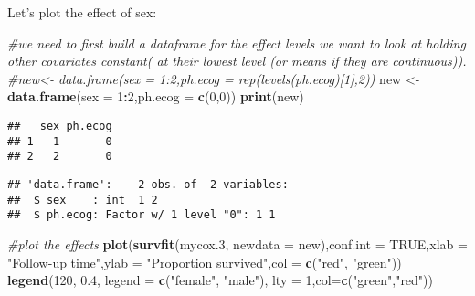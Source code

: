 \documentclass[]{book}
\newenvironment{Shaded}{\begin{snugshade}}{\end{snugshade}}
\newcommand{\KeywordTok}[1]{\textcolor[rgb]{0.13,0.29,0.53}{\textbf{#1}}}
\newcommand{\DataTypeTok}[1]{\textcolor[rgb]{0.13,0.29,0.53}{#1}}
\newcommand{\DecValTok}[1]{\textcolor[rgb]{0.00,0.00,0.81}{#1}}
\newcommand{\FloatTok}[1]{\textcolor[rgb]{0.00,0.00,0.81}{#1}}
\newcommand{\StringTok}[1]{\textcolor[rgb]{0.31,0.60,0.02}{#1}}
\newcommand{\CommentTok}[1]{\textcolor[rgb]{0.56,0.35,0.01}{\textit{#1}}}
\newcommand{\OtherTok}[1]{\textcolor[rgb]{0.56,0.35,0.01}{#1}}
\newcommand{\OperatorTok}[1]{\textcolor[rgb]{0.81,0.36,0.00}{\textbf{#1}}}
\newcommand{\NormalTok}[1]{#1}
\theoremstyle{definition}
\theoremstyle{definition}
\theoremstyle{definition}
\theoremstyle{remark}
\begin{document}
Let's plot the effect of sex:

\begin{Shaded}
\begin{Highlighting}[]
\CommentTok{#we need to first build a dataframe for the effect levels we want to look at holding other covariates constant( at their lowest level (or means if they are continuous)).}
\CommentTok{#new<- data.frame(sex = 1:2,ph.ecog = rep(levels(ph.ecog)[1],2))}
\NormalTok{new <-}\StringTok{ }\KeywordTok{data.frame}\NormalTok{(}\DataTypeTok{sex =} \DecValTok{1}\OperatorTok{:}\DecValTok{2}\NormalTok{,}\DataTypeTok{ph.ecog =} \KeywordTok{c}\NormalTok{(}\DecValTok{0}\NormalTok{,}\DecValTok{0}\NormalTok{))}
\KeywordTok{print}\NormalTok{(new)}
\end{Highlighting}
\end{Shaded}

\begin{verbatim}
##   sex ph.ecog
## 1   1       0
## 2   2       0
\end{verbatim}

\begin{Shaded}
\end{Shaded}

\begin{verbatim}
## 'data.frame':    2 obs. of  2 variables:
##  $ sex    : int  1 2
##  $ ph.ecog: Factor w/ 1 level "0": 1 1
\end{verbatim}

\begin{Shaded}
\begin{Highlighting}[]
\CommentTok{#plot the effects}
\KeywordTok{plot}\NormalTok{(}\KeywordTok{survfit}\NormalTok{(mycox.}\DecValTok{3}\NormalTok{, }\DataTypeTok{newdata =}\NormalTok{ new),}\DataTypeTok{conf.int =} \OtherTok{TRUE}\NormalTok{,}\DataTypeTok{xlab =} \StringTok{"Follow-up time"}\NormalTok{,}\DataTypeTok{ylab =} \StringTok{"Proportion survived"}\NormalTok{,}\DataTypeTok{col =} \KeywordTok{c}\NormalTok{(}\StringTok{"red"}\NormalTok{, }\StringTok{"green"}\NormalTok{))}
\KeywordTok{legend}\NormalTok{(}\DecValTok{120}\NormalTok{, }\FloatTok{0.4}\NormalTok{, }\DataTypeTok{legend =} \KeywordTok{c}\NormalTok{(}\StringTok{"female"}\NormalTok{, }\StringTok{"male"}\NormalTok{), }\DataTypeTok{lty =} \DecValTok{1}\NormalTok{,}\DataTypeTok{col=}\KeywordTok{c}\NormalTok{(}\StringTok{"green"}\NormalTok{,}\StringTok{"red"}\NormalTok{))}
\end{Highlighting}
\end{Shaded}
\end{document}
